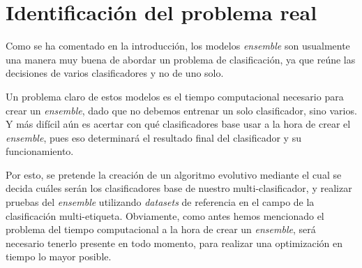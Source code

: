 \section{Identificación del problema real}
\label{sec:ProblemaReal}


Como se ha comentado en la introducción, los modelos \textit{ensemble} son usualmente una manera muy buena de abordar un problema de clasificación, ya que reúne las decisiones de varios clasificadores y no de uno solo.

Un problema claro de estos modelos es el tiempo computacional necesario para crear un \textit{ensemble}, dado que no debemos entrenar un solo clasificador, sino varios. Y más difícil aún es acertar con qué clasificadores base usar a la hora de crear el \textit{ensemble}, pues eso determinará el resultado final del clasificador y su funcionamiento. 

Por esto, se pretende la creación de un algoritmo evolutivo mediante el cual se decida cuáles serán los clasificadores base de nuestro multi-clasificador, y realizar pruebas del \textit{ensemble} utilizando \textit{datasets} de referencia en el campo de la clasificación multi-etiqueta. Obviamente, como antes hemos mencionado el problema del tiempo computacional a la hora de crear un \textit{ensemble}, será necesario tenerlo presente en todo momento, para realizar una optimización en tiempo lo mayor posible.

